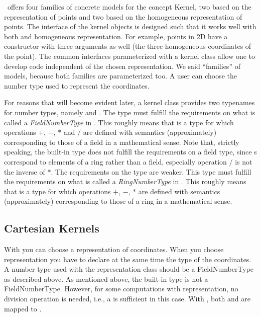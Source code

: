 \cgal\ offers four families of concrete models for the concept Kernel,
two based on the  representation of
points and two based on the homogeneous representation of points. The
interface of the kernel objects is designed such that it works well
with both  and homogeneous
representation. For example, points in 2D have a constructor with
three arguments as well (the three homogeneous coordinates of the
point).  The common interfaces parameterized with a kernel class allow
one to develop code independent of the chosen representation.  We said
``families'' of models, because both families are parameterized too.
A user can choose the number type used to represent the coordinates.

For reasons that will become evident later, a kernel class provides
two typenames for number types, namely  and .
The type  must fulfill the
requirements on what is called a {\em FieldNumberType} in \cgal. This
roughly means that  is a type for which operations
$+$, $-$, $*$ and $/$ are defined with semantics (approximately)
corresponding to those of a field in a mathematical sense. Note that,
strictly speaking, the built-in type  does not fulfill the
requirements on a field type, since s correspond to elements
of a ring rather than a field, especially operation $/$ is not the
inverse of $*$.  The requirements on the type  are
weaker.  This type must fulfill the requirements on what is called a
{\em RingNumberType} in \cgal. This roughly means that
 is a type for which operations $+$, $-$, $*$ are
defined with semantics (approximately) corresponding to those of a
ring in a mathematical sense. 

\subsection{Cartesian Kernels}
With  you can choose a
 representation of coordinates. When you
choose  representation you have to
declare at the same time the type of the coordinates.  A number type
used with the  representation class should be a
FieldNumberType as described above. As mentioned above, the built-in
type  is not a FieldNumberType. However, for some
computations with  representation, no
division operation is needed, i.e., a  is sufficient in
this case. With , both
 and
 are mapped to
.

